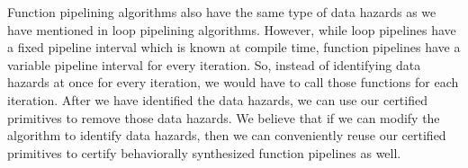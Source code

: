 Function pipelining algorithms also have the same type of data hazards as we have mentioned in loop pipelining algorithms. However, while loop pipelines have a fixed pipeline interval which is known at compile time, function pipelines have a variable pipeline interval for every iteration. So, instead of identifying data hazards at once for every iteration, we would have to call those functions for each iteration. After we have identified the data hazards, we can use our certified primitives to remove those data hazards. We believe that if we can modify the algorithm to identify data hazards, then we can conveniently reuse our certified primitives to certify behaviorally synthesized function pipelines as well.     